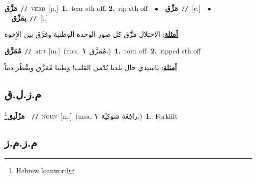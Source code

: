 \documentclass[10pt,a4paper,twoside]{article} %
\begin{document}
\begin{multicols}{2}
{\setlength\topsep{0pt}\textbf{\foreignlanguage{arabic}{مَزَّق}}\ {\color{gray}\texttt{//}\color{black}}\ \textsc{verb}\ [p.]\ \textbf{1.}~tear sth off.  \textbf{2.}~rip sth off\ \ $\bullet$\ \ \setlength\topsep{0pt}\textbf{\foreignlanguage{arabic}{مَزِّق}}\ {\color{gray}\texttt{//}\color{black}}\ [c.]\ \ $\bullet$\ \ \setlength\topsep{0pt}\textbf{\foreignlanguage{arabic}{يمَزِّق}}\ {\color{gray}\texttt{//}\color{black}}\ [i.]\  \begin{flushright}\color{gray}\foreignlanguage{arabic}{\textbf{\underline{\foreignlanguage{arabic}{أمثلة}}}: الاحتلال مَزَّق كل صور الوحدة الوطنية وفرَّق بين الإِخوة}\end{flushright}\color{black}} \vspace{2mm}

{\setlength\topsep{0pt}\textbf{\foreignlanguage{arabic}{مُمَزَّق}}\ {\color{gray}\texttt{//}\color{black}}\ \textsc{adj}\ [m.]\ \color{gray}(msa. \foreignlanguage{arabic}{مُمَزَّق}~\foreignlanguage{arabic}{\textbf{١.}})\color{black}\ \textbf{1.}~torn off.  \textbf{2.}~ripped sth off\  \begin{flushright}\color{gray}\foreignlanguage{arabic}{\textbf{\underline{\foreignlanguage{arabic}{أمثلة}}}: ياسيدي حال بلدنا يُدْمي القلب! وطننا مُمَزَّق ويقْطُر دماً}\end{flushright}\color{black}} \vspace{2mm}

\vspace{-3mm}
\subsection*{\color{blue}\foreignlanguage{arabic}{م.ز.ل.ق}\color{blue}{ (ntws)}} 

{\setlength\topsep{0pt}\textbf{\foreignlanguage{arabic}{مَزْلَيق}}\footnote{Hebrew loanword}\ \ {\color{gray}\texttt{//}\color{black}}\ \textsc{noun}\ [m.]\ \color{gray}(msa. \foreignlanguage{arabic}{رافِعَة شوكيِّة}~\foreignlanguage{arabic}{\textbf{١.}})\color{black}\ \textbf{1.}~Forklift\ } \vspace{2mm}

\vspace{-3mm}
\subsection*{\color{blue}\foreignlanguage{arabic}{م.ز.م.ز}\color{blue}{}} 


\end{multicols}
\end{document}
